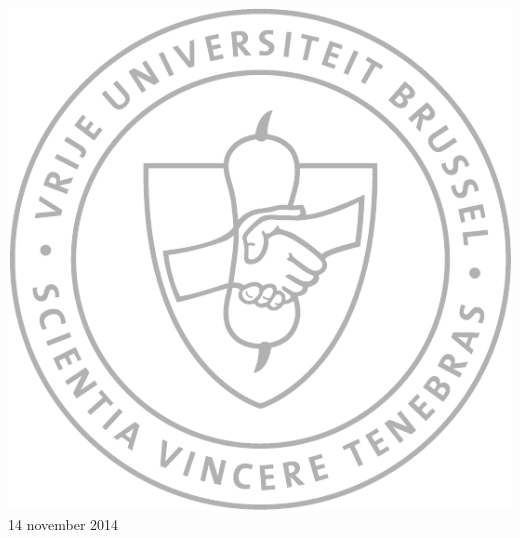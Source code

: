 \begin{titlepage}
\vspace{0.6cm}

\includegraphics[scale=0.4]{VUB_schild.pdf}\\[0.5cm]

{\large 14 november 2014}
\vfill %

\end{titlepage}